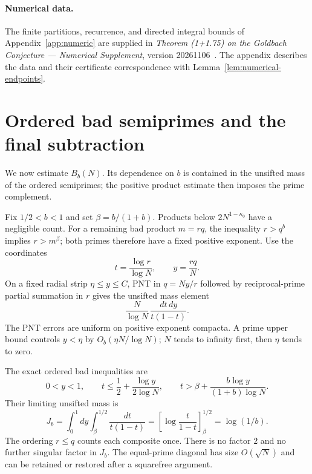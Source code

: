 \paragraph{Numerical data.}
The finite partitions, recurrence, and directed integral bounds of
Appendix~\ref{app:numeric} are supplied in
\emph{Theorem (1+1.75) on the Goldbach Conjecture --- Numerical
Supplement}, version 20261106~\cite{ChanSupplement}. The appendix describes the data and their certificate
correspondence with Lemma~\ref{lem:numerical-endpoints}.

\section{Ordered bad semiprimes and the final subtraction}
\label{sec:current-transfer}

We now estimate $B_b(N)$. Its dependence on $b$ is contained in
the unsifted mass of the ordered semiprimes; the positive product
estimate then imposes the prime complement.

Fix $1/2<b<1$ and set $\beta=b/(1+b)$.  Products below
$2N^{1-\kappa_0}$ have a negligible count.  For a remaining bad
product $m=rq$, the inequality $r>q^b$ implies $r>m^\beta$;
both primes therefore have a fixed positive exponent.  Use the
coordinates
\[
                       t=\frac{\log r}{\log N},\qquad y=\frac{rq}{N}.
\]
On a fixed radial strip $\eta\le y\le C$, PNT in $q=Ny/r$
followed by reciprocal-prime partial summation in $r$ gives the
unsifted mass element
\begin{equation}
                         \frac{N}{\log N}\,
                              \frac{dt\,dy}{t(1-t)}.
 \label{eq:current-pair-measure}
\end{equation}
The PNT errors are uniform on positive exponent compacta.  A prime
upper bound controls $y<\eta$ by $O_b(\eta N/\log N)$; $N$ tends
to infinity first, then $\eta$ tends to zero.

The exact ordered bad inequalities are
\[
 0<y<1,\qquad
 t\le\frac12+\frac{\log y}{2\log N},\qquad
 t>\beta+\frac{b\log y}{(1+b)\log N}.
\]
Their limiting unsifted mass is
\begin{equation}
 J_b=\int_0^1dy\int_\beta^{1/2}\frac{dt}{t(1-t)}
     =\left[\log\frac{t}{1-t}\right]_\beta^{1/2}
     =\log(1/b).
 \label{eq:current-bad-mass}
\end{equation}
The ordering $r\le q$ counts each composite once.  There is no
factor $2$ and no further singular factor in $J_b$.  The
equal-prime diagonal has size $O(\sqrt N)$ and can be retained or
restored after a squarefree argument.

